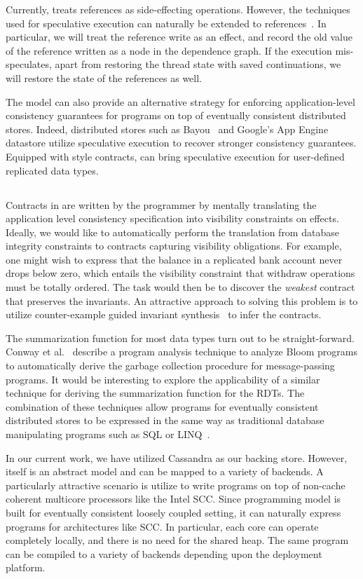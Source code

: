Currently, \rxcml treats references as side-effecting operations. However, the
techniques used for speculative execution can naturally be extended to
references~\cite{Ziarek10}. In particular, we will treat the reference write as
an effect, and record the old value of the reference written as a node in the
dependence graph. If the execution mis-speculates, apart from restoring the
thread state with saved continuations, we will restore the state of the
references as well.

The \rxcml model can also provide an alternative strategy for enforcing
application-level consistency guarantees for programs on top of eventually
consistent distributed stores. Indeed, distributed stores such as
Bayou~\cite{Bayou} and Google's App Engine datastore utilize speculative
execution to recover stronger consistency guarantees. Equipped with \quelea
style contracts, \rxcml can bring speculative execution for user-defined
replicated data types.

\subsection{\quelea}

Contracts in \quelea are written by the programmer by mentally translating the
application level consistency specification into visibility constraints on
effects. Ideally, we would like to automatically perform the translation from
database integrity constraints to contracts capturing visibility obligations.
For example, one might wish to express that the balance in a replicated bank
account never drops below zero, which entails the visibility constraint that
withdraw operations must be totally ordered. The task would then be to discover
the \emph{weakest} contract that preserves the invariants. An attractive
approach to solving this problem is to utilize counter-example guided invariant
synthesis~\cite{Cegis} to infer the contracts.

The summarization function for most data types turn out to be straight-forward.
Conway et al.~\cite{edelweiss} describe a program analysis technique to analyze
Bloom programs to automatically derive the garbage collection procedure for
message-passing programs. It would be interesting to explore the applicability
of a similar technique for deriving the summarization function for the RDTs.
The combination of these techniques allow programs for eventually consistent
distributed stores to be expressed in the same way as traditional database
manipulating programs such as SQL or LINQ~\cite{Meijer2011}.

In our current work, we have utilized Cassandra as our backing store. However,
\quelea itself is an abstract model and can be mapped to a variety of backends.
A particularly attractive scenario is utilize \quelea to write programs on top
of non-cache coherent multicore processors like the Intel SCC. Since \quelea
programming model is built for eventually consistent loosely coupled setting,
it can naturally express programs for architectures like SCC. In particular,
each core can operate completely locally, and there is no need for the shared
heap. The same \quelea program can be compiled to a variety of backends
depending upon the deployment platform.
